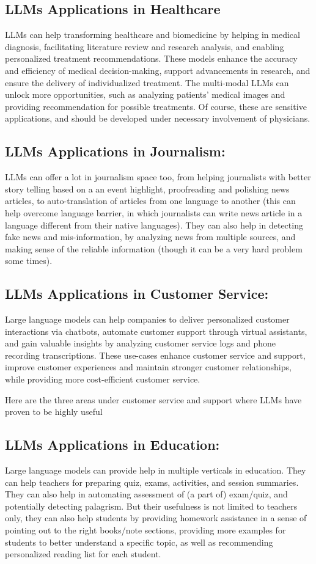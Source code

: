 \documentclass[conference]{IEEEtran}
\begin{document}
\subsection{LLMs Applications in Healthcare}
LLMs can help transforming healthcare and biomedicine by helping in medical diagnosis, facilitating literature review and research analysis, and enabling personalized treatment recommendations. These models enhance the accuracy and efficiency of medical decision-making, support advancements in research, and ensure the delivery of individualized treatment.
The multi-modal LLMs can unlock more opportunities, such as analyzing patients' medical images and providing recommendation for possible treatments. Of course, these are sensitive applications, and should be developed under necessary involvement of physicians.

\subsection{LLMs Applications in Journalism:}
LLMs can offer a lot in journalism space too, from helping journalists with better story telling based on a an event highlight, proofreading and polishing news articles, to auto-translation of articles from one language to another (this can help overcome language barrier, in which journalists can write news article in a language different from their native languages). 
They can also help in detecting fake news and mis-information, by analyzing news from multiple sources, and making sense of the reliable information (though it can be a very hard problem some times).


\subsection{LLMs Applications in Customer Service:}
Large language models can help companies to deliver personalized customer interactions via chatbots, automate customer support through virtual assistants, and gain valuable insights by analyzing customer service logs and phone recording transcriptions. These use-cases enhance customer service and support, improve customer experiences and maintain stronger customer relationships, while providing more cost-efficient customer service.

Here are the three areas under customer service and support where LLMs have proven to be highly useful

\subsection{LLMs Applications in Education:}
Large language models can provide help in multiple verticals in education.
They can help teachers for preparing quiz, exams, activities, and session summaries. 
They can also help in automating assessment of (a part of) exam/quiz, and potentially detecting palagrism.
But their usefulness is not limited to teachers only, they can also help students by providing homework assistance in a sense of pointing out to the right books/note sections, providing more examples for students to better understand a specific topic, as well as recommending personalized reading list for each student.
\end{document}
